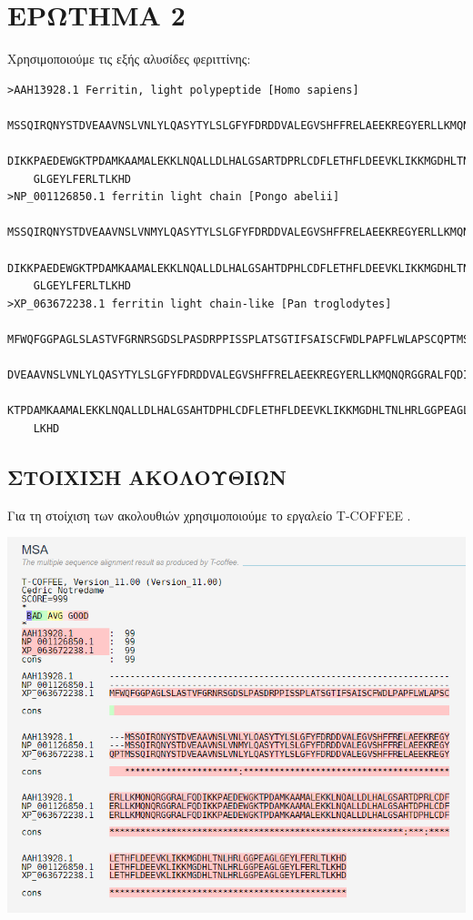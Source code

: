 \chapter{ΕΡΩΤΗΜΑ 2}
    Χρησιμοποιούμε τις εξής αλυσίδες φεριττίνης:
    \begin{graycomment} \footnotesize
    \begin{verbatim}
>AAH13928.1 Ferritin, light polypeptide [Homo sapiens]
    MSSQIRQNYSTDVEAAVNSLVNLYLQASYTYLSLGFYFDRDDVALEGVSHFFRELAEEKREGYERLLKMQNQRGGRALFQ
    DIKKPAEDEWGKTPDAMKAAMALEKKLNQALLDLHALGSARTDPRLCDFLETHFLDEEVKLIKKMGDHLTNLHRLGGPEA
    GLGEYLFERLTLKHD
>NP_001126850.1 ferritin light chain [Pongo abelii]
    MSSQIRQNYSTDVEAAVNSLVNMYLQASYTYLSLGFYFDRDDVALEGVSHFFRELAEEKREGYERLLKMQNQRGGRALFQ
    DIKKPAEDEWGKTPDAMKAAMALEKKLNQALLDLHALGSAHTDPHLCDFLETHFLDEEVKLIKKMGDHLTNLHRLGGPEA
    GLGEYLFERLTLKHD
>XP_063672238.1 ferritin light chain-like [Pan troglodytes]
    MFWQFGGPAGLSLASTVFGRNRSGDSLPASDRPPISSPLATSGTIFSAISCFWDLPAPFLWLAPSCQPTMSSQIRQNYST
    DVEAAVNSLVNLYLQASYTYLSLGFYFDRDDVALEGVSHFFRELAEEKREGYERLLKMQNQRGGRALFQDIKKPAEDEWG
    KTPDAMKAAMALEKKLNQALLDLHALGSAHTDPHLCDFLETHFLDEEVKLIKKMGDHLTNLHRLGGPEAGLGEYLFERLT
    LKHD\end{verbatim}
    \end{graycomment}

    \section{ΣΤΟΙΧΙΣΗ ΑΚΟΛΟΥΘΙΩΝ}
        Για τη στοίχιση των ακολουθιών χρησιμοποιούμε το εργαλείο T-COFFEE \cite{TCoffee}.

        \begin{center} \noindent
            \includegraphics[scale=0.75]{img/T-Coffee}
        \end{center}

